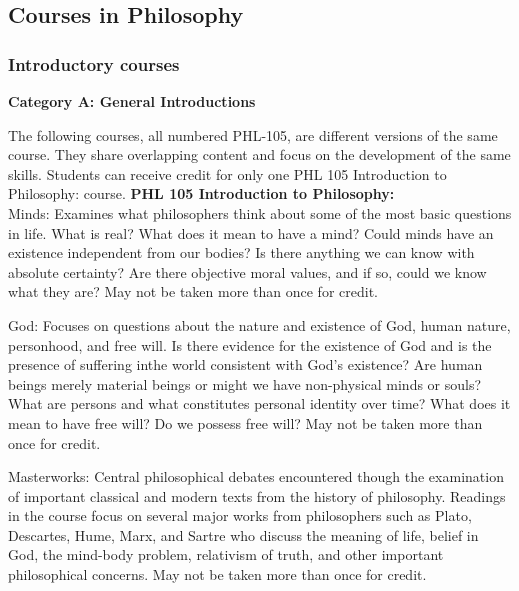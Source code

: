 \documentclass[
  letterpaper,
]{scrbook}
\begin{document}
\subsection{Courses in Philosophy}\label{courses-in-philosophy}

\subsubsection*{Introductory courses}\label{introductory-courses}

\textbf{Category A: General Introductions}

The following courses, all numbered PHL-105, are different versions of
the same course. They share overlapping content and focus on the
development of the same skills. Students can receive credit for only one
PHL 105 Introduction to Philosophy: course. \textbf{PHL 105 Introduction
to Philosophy:}\\
Minds: Examines what philosophers think about some of the most basic
questions in life. What is real? What does it mean to have a mind? Could
minds have an existence independent from our bodies? Is there anything
we can know with absolute certainty? Are there objective moral values,
and if so, could we know what they are? May not be taken more than once
for credit.

God: Focuses on questions about the nature and existence of God, human
nature, personhood, and free will. Is there evidence for the existence
of God and is the presence of suffering inthe world consistent with
God's existence? Are human beings merely material beings or might we
have non-physical minds or souls? What are persons and what constitutes
personal identity over time? What does it mean to have free will? Do we
possess free will? May not be taken more than once for credit.

Masterworks: Central philosophical debates encountered though the
examination of important classical and modern texts from the history of
philosophy. Readings in the course focus on several major works from
philosophers such as Plato, Descartes, Hume, Marx, and Sartre who
discuss the meaning of life, belief in God, the mind-body problem,
relativism of truth, and other important philosophical concerns. May not
be taken more than once for credit.
\end{document}
